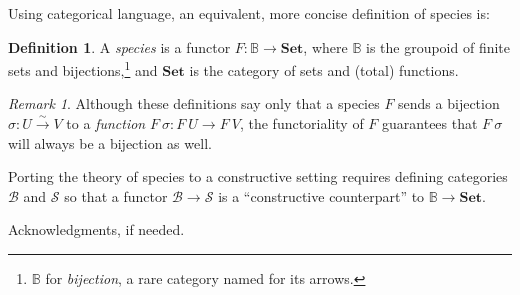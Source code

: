 \documentclass[preprint,authoryear]{sigplanconf}
\newcommand{\term}[1]{\emph{#1}}
\newcommand{\bbb}[1]{\ensuremath{\mathbb{#1}}\xspace}
\newcommand{\mcal}[1]{\ensuremath{\mathcal{#1}}}
\newcommand{\bij}{\stackrel{\sim}{\longrightarrow}}
\theoremstyle{definition}
\newtheorem{defn}[thm]{Definition}
\theoremstyle{remark}
\newtheorem*{rem}{Remark}
\newcommand{\ST}{\mcal{S}}
\newcommand{\cat}[1]{\ensuremath{\mathbf{#1}}\xspace}
\newcommand{\Set}{\cat{Set}}
\providecommand{\B}{\bbb{B}}
\newcommand{\BT}{\mcal{B}}
\begin{document}
Using categorical language, an equivalent, more
concise definition of species is:
\begin{defn}
  \label{defn:species-cat}
  A \term{species} is a functor $F : \B \to \Set$, where $\B$ is the
  groupoid of finite sets and bijections,\footnote{$\B$ for
    \emph{bijection}, a rare category named for its arrows.}  and
  $\Set$ is the category of sets and (total) functions.
\end{defn}

\begin{rem}
  Although these definitions say only that a species $F$ sends a bijection
  $\sigma : U \bij V$ to a \emph{function} $F\ \sigma : F\ U \to F\
  V$, the functoriality of $F$ guarantees that $F\ \sigma$
  will always be a bijection as well.
\end{rem}

Porting the theory of species to a constructive setting
requires defining categories $\BT$ and $\ST$ so that a functor $\BT \to
\ST$ is a ``constructive counterpart'' to $\B \to \Set$.

\acks

Acknowledgments, if needed.








\end{document}
